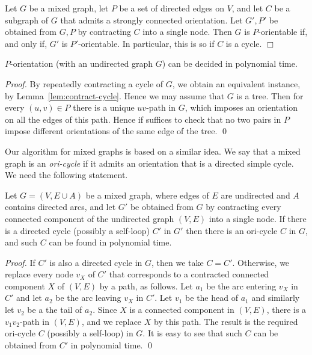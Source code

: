 \documentclass[envcountsame]{llncs}
\begin{document}
\begin{lemma} \label{lem:contract-cycle}
Let $G$ be a mixed graph, let $P$ be a set of directed edges on $V$, 
and let $C$ be a subgraph of $G$ that admits a strongly connected orientation. 
Let $G',P'$ be obtained from $G,P$ by contracting $C$ into a single node.
Then $G$ is $P$-orientable if, and only if, $G'$ is $P'$-orientable. 
In particular, this is so if $C$ is a cycle. \hfill $\Box$
\end{lemma}

\begin{corollary} \label{cor:tree}
{\sf $P$-orientation} (with an undirected graph $G$) can be decided in polynomial time.
\end{corollary}

\begin{proof}
By repeatedly contracting a cycle of $G$, we obtain an equivalent instance,
by Lemma~\ref{lem:contract-cycle}.
Hence we may assume that $G$ is a tree.
Then for every $(u,v)\in P$ there is a unique $uv$-path in $G$, 
which imposes an orientation on all the edges of this path.
Hence if suffices to check that no two pairs in $P$ 
impose different orientations of the same edge of the tree.
\qed
\end{proof}

Our algorithm for mixed graphs is based on a similar idea.
We say that a mixed graph is an {\em ori-cycle} if it admits an orientation that is a 
directed simple cycle. We need the following statement.

\begin{lemma} \label{lem:find-cycle}
Let $G=(V,E \cup A)$ be a mixed graph, where edges of $E$ are undirected and $A$ contains directed arcs, and let $G'$ be obtained from $G$ by contracting every
connected component of the undirected graph $(V,E)$ into a single node.
If there is a directed cycle (possibly  a self-loop) $C'$ in $G'$ then there is an ori-cycle $C$ in $G$,
and such $C$ can be found in polynomial time.
\end{lemma}
\begin{proof}
If $C'$ is also a directed cycle in $G$, then we take $C=C'$.
Otherwise, we replace every node $v_X$ of $C'$ that corresponds to a contracted connected component $X$ of $(V,E)$
by a path, as follows.
Let $a_1$ be the arc entering $v_X$ in $C'$ and let $a_2$ be the arc leaving $v_X$ in $C'$.
Let $v_1$ be the head of $a_1$ and similarly let $v_2$ be a the tail of $a_2$.
Since $X$ is a connected component in $(V,E)$, there is a $v_1v_2$-path in $(V,E)$, and we replace $X$ by 
this path. The result is the required ori-cycle $C$ (possibly a self-loop) in $G$.
It is easy to see that such $C$ can be obtained from $C'$ in polynomial time. 
\qed
\end{proof}
\end{document}
